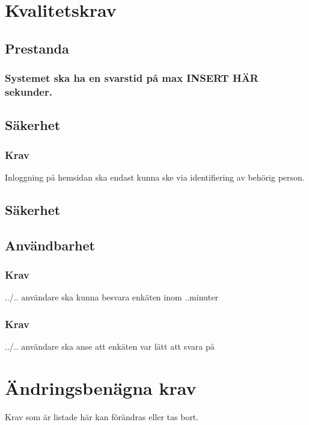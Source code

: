 \documentclass{article}
\begin{document}
    \section{Kvalitetskrav}
    \subsection{Prestanda}
    \subsubsection{Systemet ska ha en svarstid på max INSERT HÄR sekunder.}
    

    \subsection{Säkerhet}
    \subsubsection{Krav}
    Inloggning på hemsidan ska endast kunna ske via identifiering av behörig person.
    
    \subsection{Säkerhet}
    
    \subsection{Användbarhet}
    \subsubsection{Krav}
    ../.. användare ska kunna besvara enkäten inom ..minuter
    \subsubsection{Krav}
    ../.. användare ska anse att enkäten var lätt att svara på
    
    \section{Ändringsbenägna krav}
    Krav som är listade här kan förändras eller tas bort.
    
\end{document}
